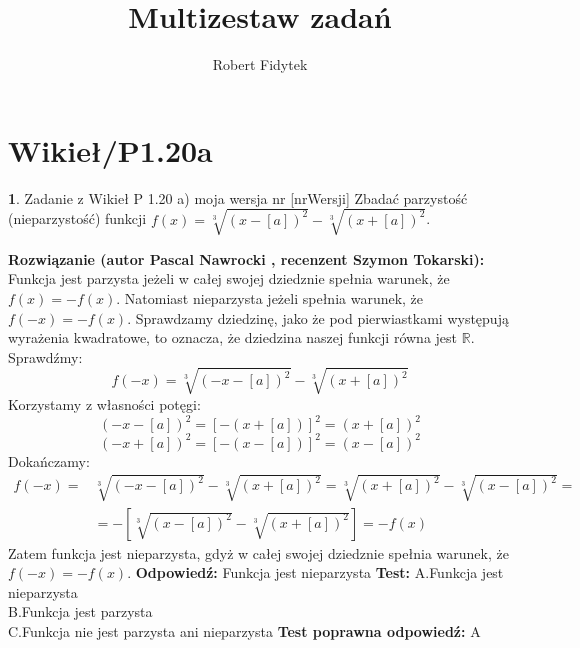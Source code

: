 \documentclass[12pt, a4paper]{article}
\title{Multizestaw zadań}
\author{Robert Fidytek}
\date{}
\theoremstyle{definition} %
\newtheorem{zad}{}
\newcommand{\kategoria}[1]{\section{#1}} %
\newcommand{\zadStart}[1]{\begin{zad}#1\newline} %
\newcommand{\zadStop}{\end{zad}}   %
\newcommand{\rozwStart}[2]{\noindent \textbf{Rozwiązanie (autor #1 , recenzent #2): }\newline} %
\newcommand{\rozwStop}{\newline}                                            %
\newcommand{\odpStart}{\noindent \textbf{Odpowiedź:}\newline}    %
\newcommand{\odpStop}{\newline}                                             %
\newcommand{\testStart}{\noindent \textbf{Test:}\newline} %
\newcommand{\testStop}{\newline} %
\newcommand{\kluczStart}{\noindent \textbf{Test poprawna odpowiedź:}\newline} %
\newcommand{\kluczStop}{\newline} %
\begin{document}
\maketitle



\kategoria{Wikieł/P1.20a}
\zadStart{Zadanie z Wikieł P 1.20 a) moja wersja nr [nrWersji]}
Zbadać parzystość (nieparzystość) funkcji $f(x)=\sqrt[3]{(x-[a])^2}-\sqrt[3]{(x+[a])^2}$.
\zadStop
\rozwStart{Pascal Nawrocki}{Szymon Tokarski}
Funkcja jest parzysta jeżeli w całej swojej dziedznie spełnia warunek, że $f(x)=-f(x)$. Natomiast nieparzysta jeżeli spełnia warunek, że $f(-x)=-f(x)$.
Sprawdzamy dziedzinę, jako że pod pierwiastkami występują wyrażenia kwadratowe, to oznacza, że dziedzina naszej funkcji równa jest $ \mathbb{R}$.
Sprawdźmy:
$$f(-x)=\sqrt[3]{(-x-[a])^2}-\sqrt[3]{(x+[a])^2}$$
Korzystamy z własności potęgi:
$$(-x-[a])^2=[-(x+[a])]^2=(x+[a])^2$$
$$(-x+[a])^2=[-(x-[a])]^2=(x-[a])^2$$
Dokańczamy:
\begin{equation}
\begin{split}
f(-x)=&\sqrt[3]{(-x-[a])^2}-\sqrt[3]{(x+[a])^2}=\sqrt[3]{(x+[a])^2}-\sqrt[3]{(x-[a])^2}=\\
&=-[\sqrt[3]{(x-[a])^2}-\sqrt[3]{(x+[a])^2}]=-f(x)
\end{split}
\end{equation}
Zatem funkcja jest nieparzysta, gdyż w całej swojej dziedznie spełnia warunek, że $f(-x)=-f(x)$.
\rozwStop
\odpStart
 Funkcja jest nieparzysta
\odpStop
\testStart
A.Funkcja jest nieparzysta
\\
B.Funkcja jest parzysta
\\
C.Funkcja nie jest parzysta ani nieparzysta
\testStop
\kluczStart
A
\kluczStop
\end{document}
